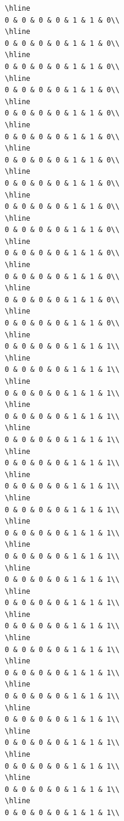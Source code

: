 \documentclass[
]{article}
\begin{document}
\begin{verbatim}
\hline
0 & 0 & 0 & 0 & 1 & 1 & 0\\
\hline
0 & 0 & 0 & 0 & 1 & 1 & 0\\
\hline
0 & 0 & 0 & 0 & 1 & 1 & 0\\
\hline
0 & 0 & 0 & 0 & 1 & 1 & 0\\
\hline
0 & 0 & 0 & 0 & 1 & 1 & 0\\
\hline
0 & 0 & 0 & 0 & 1 & 1 & 0\\
\hline
0 & 0 & 0 & 0 & 1 & 1 & 0\\
\hline
0 & 0 & 0 & 0 & 1 & 1 & 0\\
\hline
0 & 0 & 0 & 0 & 1 & 1 & 0\\
\hline
0 & 0 & 0 & 0 & 1 & 1 & 0\\
\hline
0 & 0 & 0 & 0 & 1 & 1 & 0\\
\hline
0 & 0 & 0 & 0 & 1 & 1 & 0\\
\hline
0 & 0 & 0 & 0 & 1 & 1 & 0\\
\hline
0 & 0 & 0 & 0 & 1 & 1 & 0\\
\hline
0 & 0 & 0 & 0 & 1 & 1 & 1\\
\hline
0 & 0 & 0 & 0 & 1 & 1 & 1\\
\hline
0 & 0 & 0 & 0 & 1 & 1 & 1\\
\hline
0 & 0 & 0 & 0 & 1 & 1 & 1\\
\hline
0 & 0 & 0 & 0 & 1 & 1 & 1\\
\hline
0 & 0 & 0 & 0 & 1 & 1 & 1\\
\hline
0 & 0 & 0 & 0 & 1 & 1 & 1\\
\hline
0 & 0 & 0 & 0 & 1 & 1 & 1\\
\hline
0 & 0 & 0 & 0 & 1 & 1 & 1\\
\hline
0 & 0 & 0 & 0 & 1 & 1 & 1\\
\hline
0 & 0 & 0 & 0 & 1 & 1 & 1\\
\hline
0 & 0 & 0 & 0 & 1 & 1 & 1\\
\hline
0 & 0 & 0 & 0 & 1 & 1 & 1\\
\hline
0 & 0 & 0 & 0 & 1 & 1 & 1\\
\hline
0 & 0 & 0 & 0 & 1 & 1 & 1\\
\hline
0 & 0 & 0 & 0 & 1 & 1 & 1\\
\hline
0 & 0 & 0 & 0 & 1 & 1 & 1\\
\hline
0 & 0 & 0 & 0 & 1 & 1 & 1\\
\hline
0 & 0 & 0 & 0 & 1 & 1 & 1\\
\hline
0 & 0 & 0 & 0 & 1 & 1 & 1\\
\hline
0 & 0 & 0 & 0 & 1 & 1 & 1\\

\end{verbatim}
\end{document}
